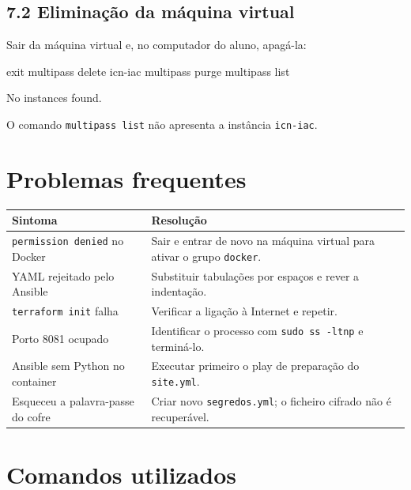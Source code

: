 \documentclass[11pt,a4paper]{article}
\newcommand{\cmd}[1]{\texttt{#1}}
\begin{document}
\subsection*{7.2 Eliminação da máquina virtual}

Sair da máquina virtual e, no computador do aluno, apagá-la:

\begin{terminal}
exit
multipass delete icn-iac
multipass purge
multipass list
\end{terminal}

\begin{saida}
No instances found.
\end{saida}

\begin{feito}
O comando \cmd{multipass list} não apresenta a instância \cmd{icn-iac}.
\end{feito}

\section*{Problemas frequentes}

\begin{center}
\small
\begin{tabular}{>{\raggedright\arraybackslash}p{6.4cm} >{\raggedright\arraybackslash}p{8.4cm}}
\toprule
\textbf{Sintoma} & \textbf{Resolução} \\
\midrule
\cmd{permission denied} no Docker & Sair e entrar de novo na máquina virtual para ativar o grupo \cmd{docker}. \\
YAML rejeitado pelo Ansible & Substituir tabulações por espaços e rever a indentação. \\
\cmd{terraform init} falha & Verificar a ligação à Internet e repetir. \\
Porto 8081 ocupado & Identificar o processo com \cmd{sudo ss -ltnp} e terminá-lo. \\
Ansible sem Python no container & Executar primeiro o play de preparação do \cmd{site.yml}. \\
Esqueceu a palavra-passe do cofre & Criar novo \cmd{segredos.yml}; o ficheiro cifrado não é recuperável. \\
\bottomrule
\end{tabular}
\end{center}

\section*{Comandos utilizados}
\end{document}
